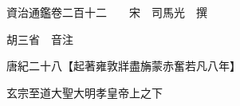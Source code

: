 










 


 
 


 

  
  
  
  
  





  
  
  
  
  
 
  

  

  
  
  



  

 
 

  
   




  

  
  


  　　資治通鑑卷二百十二　　宋　司馬光　撰

　　胡三省　音注

　　唐紀二十八【起著雍敦牂盡㫋蒙赤奮若凡八年】

　　玄宗至道大聖大明孝皇帝上之下

